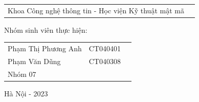 \begin{titlepage}
\begin{flushleft}
\begin{tabular}{l c}
			\hspace{4cm}Khoa Công nghệ thông tin - Học viện Kỹ thuật mật mã
			
		\end{tabular}
		
		\vspace{0.6cm}
		
		\hspace{3cm}Nhóm sinh viên thực hiện:
		
		\begin{tabular}{l c c}
			
			\hspace{4cm}Phạm Thị Phương Anh & CT040401 \\
			
			\hspace{4cm}Phạm Văn Dũng & CT040308 \\
			
			\hspace{4cm}Nhóm 07
			
			
		\end{tabular}
		
	\end{flushleft}
	
	\begin{center}
		
		\vspace{2cm}
		
		Hà Nội - 2023
		
	\end{center}
\end{titlepage}